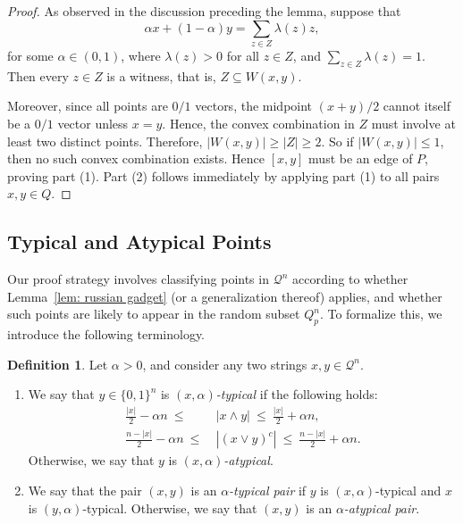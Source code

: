 \documentclass[11pt]{article}
\theoremstyle{definition}
\newtheorem{definition}{Definition}[section]
\theoremstyle{plain}
\begin{document}
\begin{proof}
As observed in the discussion preceding the lemma, suppose that
\[
\alpha x + (1 - \alpha)y = \sum_{z \in Z} \lambda(z) z,
\]
for some $\alpha \in (0,1)$, where $\lambda(z) > 0$ for all $z \in Z$, and $\sum_{z \in Z} \lambda(z) = 1$. Then every $z \in Z$ is a witness, that is, $Z \subseteq W(x,y)$.

Moreover, since all points are $0/1$ vectors, the midpoint $(x + y)/2$ cannot itself be a $0/1$ vector unless $x = y$.
Hence, the convex combination in $Z$ must involve at least two distinct points.
Therefore, $|W(x,y)| \geq |Z| \geq  2$.
So if $|W(x,y)| \leq 1$, then no such convex combination exists.
Hence $[x,y]$ must be an edge of $P$, proving part (1).
Part (2) follows immediately by applying part (1) to all pairs $x,y \in Q$.
\end{proof}

\subsection{Typical and Atypical Points}

Our proof strategy involves classifying points in $\mathcal{Q}^n$ according to whether Lemma~\ref{lem: russian gadget} (or a generalization thereof) applies, and whether such points are likely to appear in the random subset ${Q}_p^n$. To formalize this, we introduce the following terminology.

\begin{definition}
Let $\alpha > 0$, and consider any two strings $x, y \in \mathcal{Q}^n$.
\begin{enumerate}
    \item We say that $y \in \{0,1\}^n$ is \emph{$(x, \alpha)$-typical} if the following holds:
    \begin{align*}
        \frac{|x|}{2} - \alpha n \ \leq\ &|x \land y| \ \leq\ \frac{|x|}{2} + \alpha n, \\
        \frac{n - |x|}{2} - \alpha n \ \leq\ &|(x \lor y)^c| \ \leq\ \frac{n - |x|}{2} + \alpha n.
    \end{align*}
    Otherwise, we say that $y$ is \emph{$(x, \alpha)$-atypical}.
    
    \item We say that the pair $(x, y)$ is an \emph{$\alpha$-typical pair} if $y$ is $(x, \alpha)$-typical and $x$ is $(y, \alpha)$-typical. Otherwise, we say that $(x, y)$ is an \emph{$\alpha$-atypical pair}.
\end{enumerate}
\end{definition}
\end{document}
